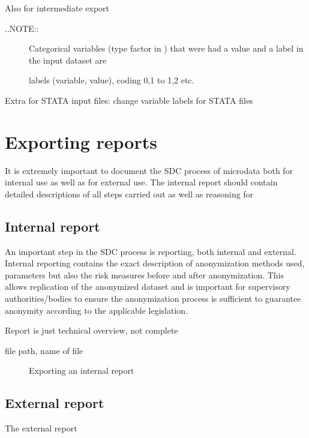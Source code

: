 \documentclass[letterpaper,10pt,english]{sphinxmanual}
\begin{document}
Also for intermediate export
\begin{description}
\item[{..NOTE::}] \leavevmode
Categorical variables (type factor in ) that were had a value and a
label in the input dataset are

labels (variable, value), coding 0,1 to 1,2 etc.

\end{description}

Extra for STATA input files: change variable labels for STATA files


\section{Exporting reports}
\label{\detokenize{export:exporting-reports}}
It is extremely important to document the SDC process of microdata both for internal
use as well as for external use. The internal report should contain detailed descriptions
of all steps carried out as well as reasoning for


\subsection{Internal report}
\label{\detokenize{export:internal-report}}
An important step in the SDC process is reporting, both internal and external.
Internal reporting contains the exact description of anonymization methods used,
parameters but also the risk measures before and after anonymization. This allows
replication of the anonymized dataset and is important for supervisory authorities/bodies
to ensure the anonymization process is sufficient to guarantee anonymity according
to the applicable legislation.

Report is just technical overview, not complete

file path, name of file

\begin{figure}[htbp]
\centering
\capstart

\noindent{}
\caption{Exporting an internal report}\label{\detokenize{export:fig102}}\label{\detokenize{export:id2}}\end{figure}


\subsection{External report}
\label{\detokenize{export:external-report}}
The external report
\end{document}
